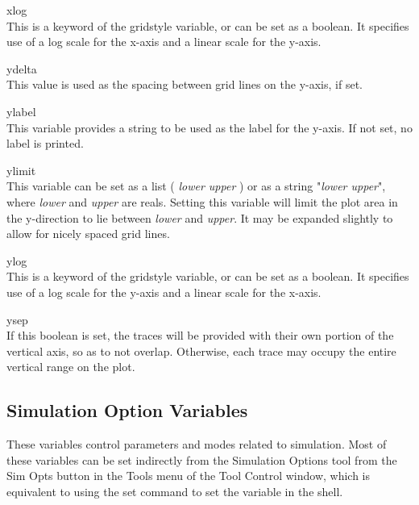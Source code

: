 \begin{description}
\item{\et xlog}\\
This is a keyword of the {\et gridstyle} variable, or can be set as a
boolean.  It specifies use of a log scale for the x-axis and a linear
scale for the y-axis.

\item{\et ydelta}\\
This value is used as the spacing between grid lines on the y-axis, if
set.

\item{\et ylabel}\\
This variable provides a string to be used as the label for the
y-axis.  If not set, no label is printed.

\item{\et ylimit}\\
This variable can be set as a list {\vt (} {\it lower upper} {\vt )}
or as a string {\vt "}{\it lower upper}{\vt "}, where {\it lower} and
{\it upper} are reals.  Setting this variable will limit the plot area
in the y-direction to lie between {\it lower} and {\it upper}.  It may
be expanded slightly to allow for nicely spaced grid lines.

\item{\et ylog}\\
This is a keyword of the {\et gridstyle} variable, or can be set as a
boolean.  It specifies use of a log scale for the y-axis and a linear
scale for the x-axis.

\item{\et ysep}\\
If this boolean is set, the traces will be provided with their own
portion of the vertical axis, so as to not overlap.  Otherwise, each
trace may occupy the entire vertical range on the plot.
\end{description}

\subsection{Simulation Option Variables}
\label{simvars}


These variables control parameters and modes related to simulation. 
Most of these variables can be set indirectly from the {\cb Simulation
Options} tool from the {\cb Sim Opts} button in the {\cb Tools} menu
of the {\cb Tool Control} window, which is equivalent to using the
{\cb set} command to set the variable in the {\WRspice} shell.

